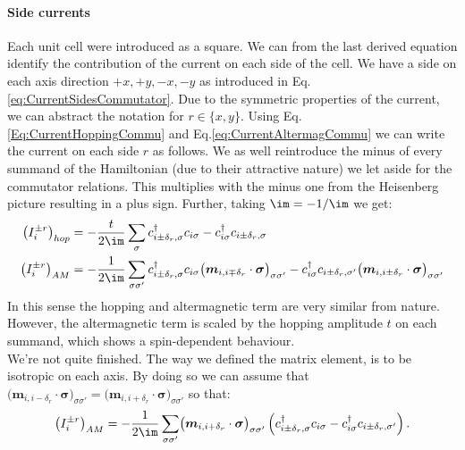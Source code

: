 \documentclass[../main.tex]{subfile}
\begin{document}
\paragraph{Side currents}
Each unit cell were introduced as a square. We can from the last derived equation identify the contribution of the current on each side of the cell. We have a side on 
each axis direction $+x, +y, -x, -y$ as introduced in Eq.\ref{eq:CurrentSidesCommutator}. Due to the symmetric properties of the current, we can abstract the notation
for $r\in\{x,y\}$. Using Eq.\ref{Eq:CurrentHoppingCommu} and Eq.\ref{eq:CurrentAltermagCommu} we can write the current on each side $r$ as follows.
We as well reintroduce the minus of every summand of the Hamiltonian (due to their attractive nature) we let aside for the commutator relations. This multiplies 
with the minus one from the Heisenberg picture resulting in a plus sign. Further, taking $\im = -1/\im$ we get:
\begin{align}
    \left(I_{i}^{\pm r}\right)_{hop} &= -\frac{t}{2\im}\sum_{\sigma}c_{i\pm\delta_r,\sigma}^{\dagger}c_{i\sigma} -c_{i\sigma}^{\dagger}c_{i\pm\delta_r,\sigma}  \\
    \left(I_{i}^{\pm r}\right)_{AM} &=  -\frac{1}{2\im}\sum_{\sigma\sigma'}c_{i\pm\delta_r,\sigma}^{\dagger}c_{i\sigma}\bigl(\bm{m}_{i,i\mp\delta_r}\cdot\bm{\sigma}\bigr)_{\sigma\sigma'} - c_{i\sigma}^{\dagger}c_{i\pm\delta_r,\sigma'}\bigl(\bm{m}_{i,i\pm\delta_r}\cdot\bm{\sigma}\bigr)_{\sigma\sigma'} 
\end{align}
In this sense the hopping and altermagnetic term are very similar from nature. However, the altermagnetic term is scaled by the hopping amplitude $t$ on each summand, 
which shows a spin-dependent behaviour.\\

We're not quite finished. The way we defined the matrix element, is to be isotropic on each axis. By doing so we can 
assume that $\bigl(\bm{m}_{i,i-\delta_r}\cdot\bm{\sigma}\bigr)_{\sigma\sigma'} = \bigl(\bm{m}_{i,i+\delta_r}\cdot\bm{\sigma}\bigr)_{\sigma\sigma'}$ so that:
\begin{equation}
    \left(I_{i}^{\pm r}\right)_{AM} =  -\frac{1}{2\im}\sum_{\sigma\sigma'}\bigl(\bm{m}_{i,i+\delta_r}\cdot\bm{\sigma}\bigr)_{\sigma\sigma'}\left(c_{i\pm\delta_r,\sigma}^{\dagger}c_{i\sigma} - c_{i\sigma}^{\dagger}c_{i\pm\delta_r,\sigma'}\right).
\end{equation}
\end{document}
